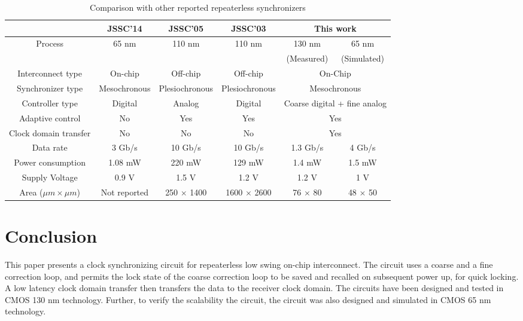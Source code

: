 \documentclass[journal,twoside,letterpaper]{IEEEtran}
\begin{document}
\begin{table*}
\begin{center}
\caption{Comparison with other reported repeaterless synchronizers}
\label{tbl:compare}
\begin{tabular}{|c|c|c|c||c|c|}
\hline 
 & JSSC'14 \cite{Lee-jssc14} & JSSC'05 
\cite{phase_interpolator} & JSSC'03 \cite{dig_pi_jssc03} & 
\multicolumn{2}{c|}{This work} \\ \hline 
Process & 65 nm & 110 nm & 110 nm & 130 nm & 65 nm \\
 & & & & (Measured) & (Simulated) \\ \hline
Interconnect type & On-chip & Off-chip & Off-chip & \multicolumn{2}{c|}{On-Chip}\\ \hline
Synchronizer type & Mesochronous & Plesiochronous & Plesiochronous & \multicolumn{2}{c|}{Mesochronous} \\ \hline
Controller type & Digital & Analog & Digital & \multicolumn{2}{c|}{Coarse digital + fine analog} \\ \hline
Adaptive control & No & Yes & Yes & \multicolumn{2}{c|}{Yes} \\ \hline
Clock domain transfer & No & No & No & \multicolumn{2}{c|}{Yes} \\ \hline
Data rate & 3 Gb/s & 10 Gb/s & 10 Gb/s & 1.3 Gb/s & 4 Gb/s \\ \hline
Power consumption & 1.08 mW & 220 mW & 129 mW & 1.4 mW & 1.5 mW  \\ \hline
Supply Voltage & 0.9 V & 1.5 V & 1.2 V & 1.2 V & 1 V \\ \hline
Area ($\mu m\times \mu m$) & Not reported & 250 $\times$ 1400 & 1600 $\times$ 2600 & 76 $\times$ 80 & 48 $\times$ 50\\ \hline
\end{tabular}
\end{center}
\end{table*}


\section{Conclusion}
\label{sec:conclude}
This paper presents a clock synchronizing circuit for 
repeaterless low swing on-chip interconnect. The circuit uses a 
coarse and a fine correction loop, and permits the lock state of the
coarse correction loop to be saved and recalled on subsequent power up, 
for quick locking. A low latency clock domain transfer then
transfers the data to the receiver clock domain. The circuits have been designed
and tested in CMOS 130 nm technology. Further, to verify the scalability 
the circuit, the circuit was also designed and simulated in CMOS 65 nm technology.
\end{document}

